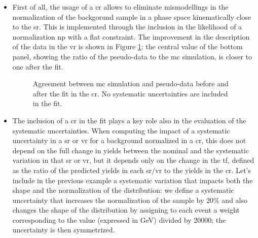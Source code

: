 \begin{itemize}
\item First of all, the usage of a \gls{cr} allows to eliminate mismodellings in the normalization of the backgorund sample in a phase space 
kinematically close to the \gls{sr}. This is implemented through the inclusion in the likelihood of a normalization \gls{np} with a flat constraint.
The improvement in the description of the data in the \gls{vr} is shown in Figure \ref{fig:stat:VRclosure}: the central value of the bottom panel,
showing the ratio of the pseudo-data to the \gls{mc} simulation, is closer to one after the fit.

\begin{figure}[h]
\centering 
{}
\caption{
Agreement between \gls{mc} simulation and pseudo-data  before and  after the fit in the \gls{cr}. No systematic uncertainties are included in the fit. 
}
\label{fig:stat:VRclosure}
\end{figure}

\item The inclusion of a \gls{cr} in the fit plays a key role also in the evaluation of the systematic uncertainties. 
When computing the impact of a systematic uncertainty in a \gls{sr} or \gls{vr} for a background normalized in a \gls{cr}, 
this does not depend on the full change in yields between the nominal and the systematic variation in that \gls{sr} or \gls{vr},
but it depends only on the change in the \gls{tf}, defined as the ratio of the predicted yields in each \gls{sr}/\gls{vr} to the yields in the \gls{cr}. 
Let's include in the previous example a systematic variation that impacts both the shape and the normalization of the \meff distribution: 
we define a systematic uncertainty that increases the normalization of the sample by 20\% and also changes the shape of the \meff distribution by 
assigning to each event a weight corresponding to the \meff value (expressed in GeV) divided by 20000; the uncertainty is then symmetrized. 


\end{itemize}
